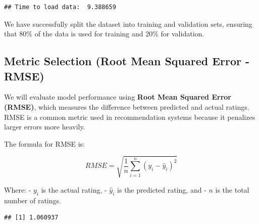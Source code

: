 \documentclass[
]{article}
\newenvironment{Shaded}{}{}
\newcommand{\CommentTok}[1]{\textcolor[rgb]{0.38,0.63,0.69}{\textit{#1}}}
\newcommand{\ControlFlowTok}[1]{\textcolor[rgb]{0.00,0.44,0.13}{\textbf{#1}}}
\newcommand{\DecValTok}[1]{\textcolor[rgb]{0.25,0.63,0.44}{#1}}
\newcommand{\FunctionTok}[1]{\textcolor[rgb]{0.02,0.16,0.49}{#1}}
\newcommand{\NormalTok}[1]{#1}
\newcommand{\OtherTok}[1]{\textcolor[rgb]{0.00,0.44,0.13}{#1}}
\newcommand{\SpecialCharTok}[1]{\textcolor[rgb]{0.25,0.44,0.63}{#1}}
\begin{document}
\begin{verbatim}
## Time to load data:  9.388659
\end{verbatim}

We have successfully split the dataset into training and validation
sets, ensuring that 80\% of the data is used for training and 20\% for
validation.

\subsection{Metric Selection (Root Mean Squared Error -
RMSE)}\label{metric-selection-root-mean-squared-error---rmse}

We will evaluate model performance using \textbf{Root Mean Squared Error
(RMSE)}, which measures the difference between predicted and actual
ratings. RMSE is a common metric used in recommendation systems because
it penalizes larger errors more heavily.

The formula for RMSE is:

\[
RMSE = \sqrt{\frac{1}{n} \sum_{i=1}^{n} (y_i - \hat{y}_i)^2}
\]

Where: - \(y_i\) is the actual rating, - \(\hat{y}_i\) is the predicted
rating, and - \(n\) is the total number of ratings.

\begin{Shaded}
\end{Shaded}

\begin{verbatim}
## [1] 1.060937
\end{verbatim}
\end{document}
